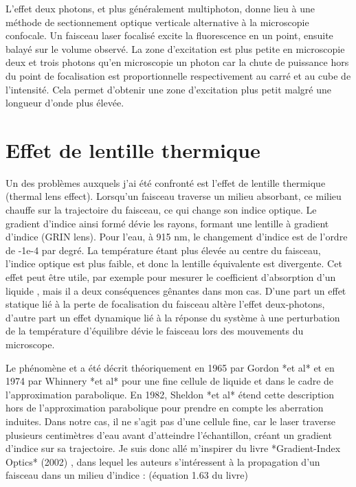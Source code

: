 L'effet deux photons, et plus généralement multiphoton, donne lieu à une méthode de sectionnement optique verticale alternative à la microscopie confocale. Un faisceau laser focalisé excite la fluorescence en un point, ensuite balayé sur le volume observé. La zone d'excitation est plus petite en microscopie deux et trois photons qu'en microscopie un photon car la chute de puissance hors du point de focalisation est proportionnelle respectivement au carré et au cube de l'intensité. Cela permet d'obtenir une zone d'excitation plus petit malgré une longueur d'onde plus élevée.

\section{Effet de lentille thermique}

Un des problèmes auxquels j'ai été confronté est l'effet de lentille thermique (thermal lens effect). Lorsqu'un faisceau traverse un milieu absorbant, ce milieu chauffe sur la trajectoire du faisceau, ce qui change son indice optique. Le gradient d'indice ainsi formé dévie les rayons, formant une lentille à gradient d'indice (GRIN lens). Pour l'eau, à 915 nm, le changement d'indice est de l'ordre de -1e-4 par degré. La température étant plus élevée au centre du faisceau, l'indice optique est plus faible, et donc la lentille équivalente est divergente. Cet effet peut être utile, par exemple pour mesurer le coefficient d'absorption d'un liquide \cite{whinnery_laser_1974}, mais il a deux conséquences gênantes dans mon cas. D'une part un effet statique lié à la perte de focalisation du faisceau altère l'effet deux-photons, d'autre part un effet dynamique lié à la réponse du système à une perturbation de la température d'équilibre dévie le faisceau lors des mouvements du microscope.



Le phénomène et a été décrit théoriquement en 1965 par Gordon *et al* \cite{gordon_longtransient_1965} et en 1974 par Whinnery *et al* \cite{whinnery_laser_1974} pour une fine cellule de liquide et dans le cadre de l'approximation parabolique. En 1982, Sheldon *et al* \cite{sheldon_laser-induced_1982} étend cette description hors de l'approximation parabolique pour prendre en compte les aberration induites. Dans notre cas, il ne s'agit pas d'une cellule fine, car le laser traverse plusieurs centimètres d'eau avant d'atteindre l'échantillon, créant un gradient d'indice sur sa trajectoire. Je suis donc allé m'inspirer du livre *Gradient-Index Optics* (2002) \cite{gomez-reino_gradient-index_2002}, dans lequel les auteurs s'intéressent à la propagation d'un faisceau dans un milieu d'indice : (équation 1.63 du livre)

